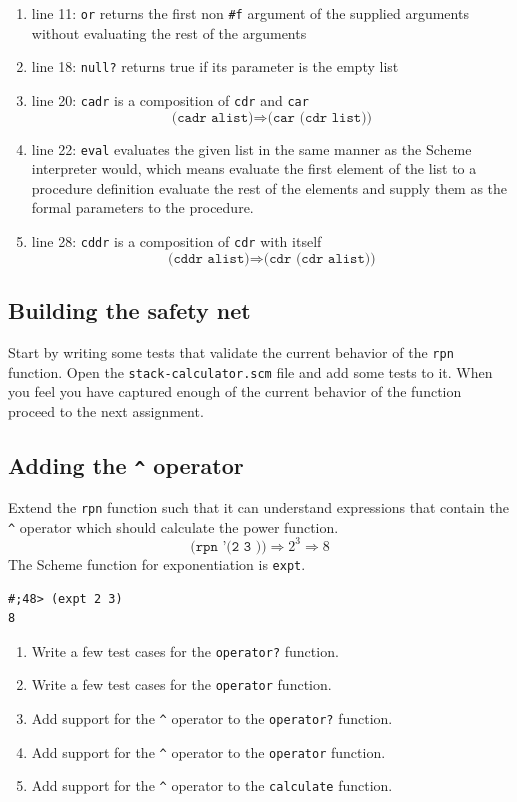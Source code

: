 \documentclass[12pt,a4paper,english,twoside]{article}
\begin{document}
\begin{enumerate}
\item line 11: \texttt{or} returns the first non \texttt{\#f} argument of the 
  supplied arguments without evaluating the rest of the arguments
  \item line 18: \texttt{null?} returns true if its parameter is the empty list
  \item line 20: \texttt{cadr} is a composition of \texttt{cdr} and \texttt{car} 
    \begin{equation*}
      \texttt{(cadr alist)} \Rightarrow \texttt{(car (cdr list))}
    \end{equation*}
  \item line 22: \texttt{eval} evaluates the given list in the same manner as the 
    Scheme interpreter would, which means evaluate the first element of the 
    list to a procedure definition evaluate the rest of the elements and 
    supply them as the formal parameters to the procedure.
  \item line 28: \texttt{cddr} is a composition of \texttt{cdr} with itself
    \begin{equation*}
      \texttt{(cddr alist)} \Rightarrow \texttt{(cdr (cdr alist))}
    \end{equation*}
\end{enumerate}
\subsection{Building the safety net}
Start by writing some tests that validate the current behavior of the 
\texttt{rpn} function. Open the \texttt{stack-calculator.scm} file and add 
some tests to it. When you feel you have captured enough of the current 
behavior of the function proceed to the next assignment.
\subsection{Adding the \texttt{\^{}} operator}
Extend the \texttt{rpn} function such that it can understand expressions that 
contain the \texttt{\^{}} operator which should calculate the power function.  
\begin{equation*}
\texttt{(rpn '(2 3 \^{}))} \Rightarrow 2^{3} \Rightarrow 8 
\end{equation*}
The Scheme function for exponentiation is \texttt{expt}.
\begin{lstlisting}
#;48> (expt 2 3)
8
\end{lstlisting}
\begin{enumerate}
  \item Write a few test cases for the \texttt{operator?} function.
  \item Write a few test cases for the \texttt{operator} function.
  \item Add support for the \texttt{\^{}} operator to the \texttt{operator?} function.
  \item Add support for the \texttt{\^{}} operator to the \texttt{operator} function. 
  \item Add support for the \texttt{\^{}} operator to the \texttt{calculate} function.
\end{enumerate}
\end{document}
